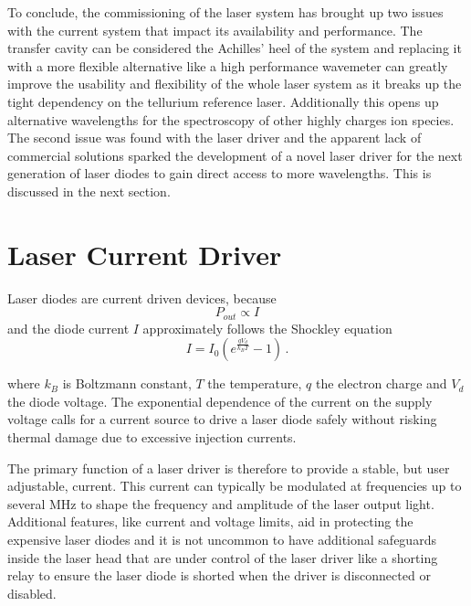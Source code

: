 To conclude, the commissioning of the laser system has brought up two issues with the current system that impact its availability and performance. The transfer cavity can be considered the Achilles' heel of the system and replacing it with a more flexible alternative like a high performance wavemeter can greatly improve the usability and flexibility of the whole laser system as it breaks up the tight dependency on the tellurium reference laser. Additionally this opens up alternative wavelengths for the spectroscopy of other highly charges ion species. The second issue was found with the laser driver and the apparent lack of commercial solutions sparked the development of a novel laser driver for the next generation of laser diodes to gain direct access to more wavelengths. This is discussed in the next section.

\clearpage
\section{Laser Current Driver}%
\label{sec:laser_current_driver}
Laser diodes are current driven devices, because
\begin{equation*}
    P_{out} \propto I
\end{equation*}
and the diode current $I$ approximately follows the Shockley equation \cite{shockley_diode}
\begin{equation}
    I = I_0 \left( e^{\frac{qV_d}{k_B T}} - 1\right) \, . \label{eqn:shockley}
\end{equation}

where $k_B$ is Boltzmann constant, $T$ the temperature, $q$ the electron charge and $V_d$ the diode voltage. The exponential dependence of the current on the supply voltage calls for a current source to drive a laser diode safely without risking thermal damage due to excessive injection currents.

The primary function of a laser driver is therefore to provide a stable, but user adjustable, current. This current can typically be modulated at frequencies up to several \unit{\MHz} to shape the frequency and amplitude of the laser output light. Additional features, like current and voltage limits, aid in protecting the expensive laser diodes and it is not uncommon to have additional safeguards inside the laser head that are under control of the laser driver like a shorting relay to ensure the laser diode is shorted when the driver is disconnected or disabled.

